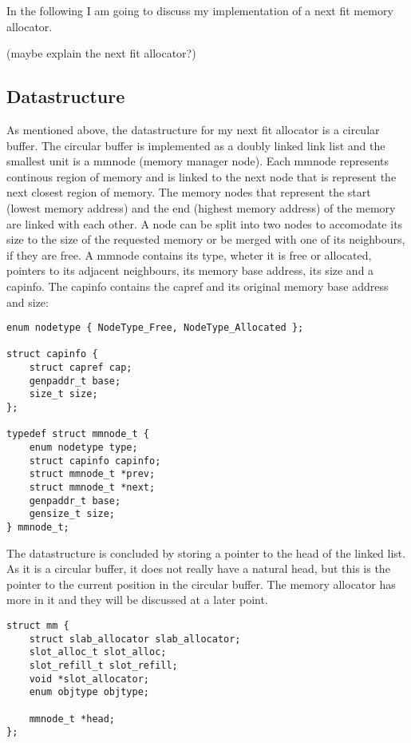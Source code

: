 In the following I am going to discuss my implementation of a next fit memory
allocator.

(maybe explain the next fit allocator?)

\subsection{Datastructure}

As mentioned above, the datastructure for my next fit allocator is a circular
buffer.  The circular buffer is implemented as a doubly linked link list and the
smallest unit is a mmnode (memory manager node).  Each mmnode represents
continous region of memory and is linked to the next node that is represent the
next closest region of memory. The memory nodes that represent the start (lowest
memory address) and the end (highest memory address) of the memory are linked
with each other.  A node can be split into two nodes to accomodate its size to
the size of the requested memory or be merged with one of its neighbours, if
they are free.  A mmnode contains its type, wheter it is free or allocated,
pointers to its adjacent neighbours, its memory base address, its size and a
capinfo. The capinfo contains the capref and its original memory base address
and size:

\begin{lstlisting}
enum nodetype { NodeType_Free, NodeType_Allocated };

struct capinfo {
    struct capref cap;
    genpaddr_t base;
    size_t size;
};

typedef struct mmnode_t {
    enum nodetype type;
    struct capinfo capinfo;
    struct mmnode_t *prev;
    struct mmnode_t *next;
    genpaddr_t base;
    gensize_t size;
} mmnode_t;
\end{lstlisting}

The datastructure is concluded by storing a pointer to the head of the linked
list. As it is a circular buffer, it does not really have a natural head, but
this is the pointer to the current position in the circular buffer. The memory
allocator has more in it and they will be discussed at a later point.

\begin{lstlisting}
struct mm {
    struct slab_allocator slab_allocator;
    slot_alloc_t slot_alloc;
    slot_refill_t slot_refill;
    void *slot_allocator;
    enum objtype objtype;

    mmnode_t *head;
};
\end{lstlisting}

